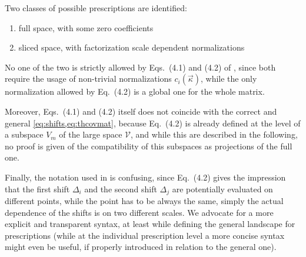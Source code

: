 Two classes of possible prescriptions are identified:

\begin{enumerate}
    \item full space, with some zero coefficients
    \item sliced space, with factorization scale dependent normalizations
\end{enumerate}

No one of the two is strictly allowed by Eqs.\ (4.1) and (4.2) of
\cite{NNPDF:2019ubu}, since both require the usage of non-trivial
normalizations $c_i(\vec{\kappa})$, while the only normalization allowed by
Eq.\ (4.2) is a global one for the whole matrix.

Moreover, Eqs.\ (4.1) and (4.2) itself does not coincide with the correct and
general \cref{eq:shifts,eq:thcovmat}, because Eq.\ (4.2) is already defined at
the level of a subspace $V_m$ of the large space $\mathcal{V}$, and while this
are described in the following, no proof is given of the compatibility of this
subspaces as projections of the full one.

Finally, the notation used in \cite{NNPDF:2019ubu} is confusing, since Eq.\
(4.2) gives the impression that the first shift $\Delta_i$ and the second shift
$\Delta_j$ are potentially evaluated on different points, while the point has
to be always the same, simply the actual dependence of the shifts is on two
different scales.
We advocate for a more explicit and transparent syntax, at least while defining
the general landscape for prescriptions (while at the individual prescription
level a more concise syntax might even be useful, if properly introduced in
relation to the general one).
